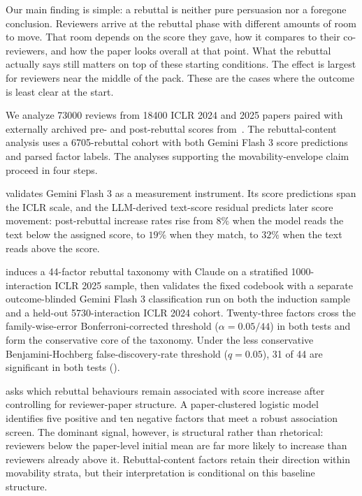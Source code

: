 \documentclass{article}
\begin{document}
Our main finding is simple: a rebuttal is neither pure persuasion nor a foregone conclusion. Reviewers arrive at the rebuttal phase with different amounts of room to move. That room depends on the score they gave, how it compares to their co-reviewers, and how the paper looks overall at that point. What the rebuttal actually says still matters on top of these starting conditions. The effect is largest for reviewers near the middle of the pack. These are the cases where the outcome is least clear at the start.

We analyze \num{73000} reviews from \num{18400} ICLR 2024 and 2025 papers paired with externally archived pre- and post-rebuttal scores from~\cite{kargaran}. The rebuttal-content analysis uses a \num{6705}-rebuttal cohort with both Gemini Flash 3 score predictions and parsed factor labels. The analyses supporting the movability-envelope claim proceed in four steps.

\textbf{} validates Gemini Flash 3 as a measurement instrument. Its score predictions span the ICLR scale, and the LLM-derived text-score residual predicts later score movement: post-rebuttal increase rates rise from $8\%$ when the model reads the text below the assigned score, to $19\%$ when they match, to $32\%$ when the text reads above the score.

\textbf{} induces a 44-factor rebuttal taxonomy with Claude on a stratified \num{1000}-interaction ICLR 2025 sample, then validates the fixed codebook with a separate outcome-blinded Gemini Flash 3 classification run on both the induction sample and a held-out \num{5730}-interaction ICLR 2024 cohort. Twenty-three factors cross the family-wise-error Bonferroni-corrected threshold ($\alpha = 0.05/44$) in both tests and form the conservative core of the taxonomy. Under the less conservative Benjamini-Hochberg false-discovery-rate threshold ($q = 0.05$), 31 of 44 are significant in both tests ().

\textbf{} asks which rebuttal behaviours remain associated with score increase after controlling for reviewer-paper structure. A paper-clustered logistic model identifies five positive and ten negative factors that meet a robust association screen. The dominant signal, however, is structural rather than rhetorical: reviewers below the paper-level initial mean are far more likely to increase than reviewers already above it. Rebuttal-content factors retain their direction within movability strata, but their interpretation is conditional on this baseline structure.
\end{document}
